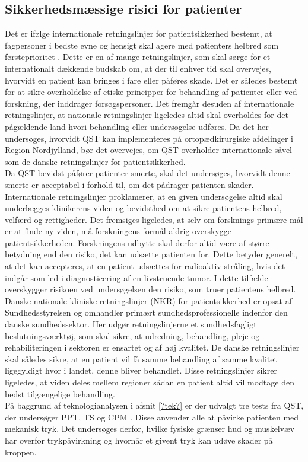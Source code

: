 \subsection{Sikkerhedsmæssige risici for patienter}
Det er ifølge internationale retningslinjer for patientsikkerhed bestemt, at fagpersoner i bedste evne og hensigt skal agere med patienters helbred som førsteprioritet \cite{helsinki2013}. Dette er en af mange retningslinjer, som skal sørge for et internationalt dækkende budskab om, at der til enhver tid skal overvejes, hvorvidt en patient kan bringes i fare eller påføres skade. Det er således bestemt for at sikre overholdelse af etiske principper for behandling af patienter eller ved forskning, der inddrager forsøgspersoner. Det fremgår desuden af internationale retningslinjer, at nationale retningslinjer ligeledes altid skal overholdes for det pågældende land hvori behandling eller undersøgelse udføres. Da det her undersøges, hvorvidt QST kan implementeres på ortopædkirurgiske afdelinger i Region Nordjylland, bør det overvejes, om QST overholder internationale såvel som de danske retningslinjer for patientsikkerhed. \cite{helsinki2013} \\
Da QST bevidst påfører patienter smerte, skal det undersøges, hvorvidt denne smerte er acceptabel i forhold til, om det pådrager patienten skader. Internationale retningslinjer proklamerer, at en given undersøgelse altid skal underlægges klinikerens viden og bevidsthed om at sikre patientens helbred, velfærd og rettigheder. Det fremsiges ligeledes, at selv om forsknings primære mål er at finde ny viden, må forskningens formål aldrig overskygge patientsikkerheden. Forskningens udbytte skal derfor altid være af større betydning end den risiko, det kan udsætte patienten for. \cite{helsinki2013} Dette betyder generelt, at det kan accepteres, at en patient udsættes for radioaktiv stråling, hvis det indgår som led i diagnosticering af en livstruende tumor. I dette tilfælde overskygger risikoen ved undersøgelsen den risiko, som truer patientens helbred. Danske nationale kliniske retningslinjer (NKR) for patientsikkerhed er opsat af Sundhedsstyrelsen og omhandler primært sundhedsprofessionelle indenfor den danske sundhedssektor. Her udgør retningslinjerne et sundhedsfagligt beslutningsværktøj, som skal sikre, at udredning, behandling, pleje og rehabiliteringen i sektoren er ensartet og af høj kvalitet. \cite{nkr2016, kommissorium2012} De danske retningslinjer skal således sikre, at en patient vil få samme behandling af samme kvalitet ligegyldigt hvor i landet, denne bliver behandlet. Disse retningslinjer sikrer ligeledes, at viden deles mellem regioner sådan en patient altid vil modtage den bedst tilgængelige behandling. \cite{nkr2016} \\
På baggrund af teknologianalysen i afsnit \ref{?tek?} er der udvalgt tre tests fra QST, der undersøger PPT, TS og CPM . Disse anvender alle at påvirke patienten med mekanisk tryk. Det undersøges derfor, hvilke fysiske grænser hud og muskelvæv har overfor trykpåvirkning og hvornår et givent tryk kan udøve skader på kroppen. \\


